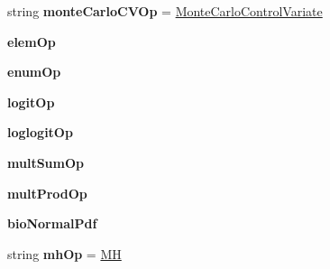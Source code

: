\begin{DoxyCompactItemize}
\item 
string {\bfseries monte\+Carlo\+C\+V\+Op} = \textquotesingle{}\hyperlink{classbio__expression_1_1_monte_carlo_control_variate}{Monte\+Carlo\+Control\+Variate}\textquotesingle{}\hypertarget{classbio__expression_1_1_operator_aa446e71781c773775c3b065cda06be01}{}\label{classbio__expression_1_1_operator_aa446e71781c773775c3b065cda06be01}

\item 
{\bfseries elem\+Op}\hypertarget{classbio__expression_1_1_operator_a0c227d33925a607a58c60a53ef2215cf}{}\label{classbio__expression_1_1_operator_a0c227d33925a607a58c60a53ef2215cf}

\item 
{\bfseries enum\+Op}\hypertarget{classbio__expression_1_1_operator_ad93b7580c4fbb8bf72a25664b5bf26d6}{}\label{classbio__expression_1_1_operator_ad93b7580c4fbb8bf72a25664b5bf26d6}

\item 
{\bfseries logit\+Op}\hypertarget{classbio__expression_1_1_operator_a7a33831659e3e53cad52284f9e7b5606}{}\label{classbio__expression_1_1_operator_a7a33831659e3e53cad52284f9e7b5606}

\item 
{\bfseries loglogit\+Op}\hypertarget{classbio__expression_1_1_operator_a15b8b3faeef0a7d55908bfe0f4ba7e1a}{}\label{classbio__expression_1_1_operator_a15b8b3faeef0a7d55908bfe0f4ba7e1a}

\item 
{\bfseries mult\+Sum\+Op}\hypertarget{classbio__expression_1_1_operator_a1d6a14e2d041ec49a78983752d420000}{}\label{classbio__expression_1_1_operator_a1d6a14e2d041ec49a78983752d420000}

\item 
{\bfseries mult\+Prod\+Op}\hypertarget{classbio__expression_1_1_operator_a34c36cf13bea8403200958f6c8075c7b}{}\label{classbio__expression_1_1_operator_a34c36cf13bea8403200958f6c8075c7b}

\item 
{\bfseries bio\+Normal\+Pdf}\hypertarget{classbio__expression_1_1_operator_aa90dd65f4e0f6c3ae886f4215857252e}{}\label{classbio__expression_1_1_operator_aa90dd65f4e0f6c3ae886f4215857252e}

\item 
string {\bfseries mh\+Op} = \textquotesingle{}\hyperlink{classbio__expression_1_1_m_h}{MH}\textquotesingle{}\hypertarget{classbio__expression_1_1_operator_a34050786a36ab06632249277eb27b84c}{}\label{classbio__expression_1_1_operator_a34050786a36ab06632249277eb27b84c}


\end{DoxyCompactItemize}
